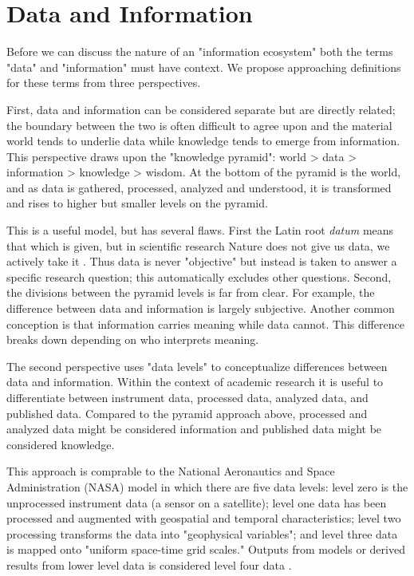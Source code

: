 \section{Data and Information}

Before we can discuss the nature of an "information ecosystem" both the terms "data" and "information" must have context. We propose approaching definitions for these terms from three perspectives. 

First, data and information can be considered separate but are directly related; the boundary between the two is often difficult to agree upon and the material world tends to underlie data while knowledge tends to emerge from information. This perspective draws upon the "knowledge pyramid": world > data > information > knowledge > wisdom. At the bottom of the pyramid is the world, and as data is gathered, processed, analyzed and understood, it is transformed and rises to higher but smaller levels on the pyramid.

This is a useful model, but has several flaws. First the Latin root \textit{datum} means that which is given, but in scientific research Nature does not give us data, we actively take it \citep{kitchin_2014}. Thus data is never "objective" but instead is taken to answer a specific research question; this automatically excludes other questions. Second, the divisions between the pyramid levels is far from clear. For example, the difference between data and information is largely subjective. Another common conception is that information carries meaning while data cannot. This difference breaks down depending on who interprets meaning.

The second perspective uses "data levels" to conceptualize differences between data and information. Within the context of academic research it is useful to differentiate between instrument data, processed data, analyzed data, and published data. Compared to the pyramid approach above, processed and analyzed data might be considered information and published data might be considered knowledge.

This approach is comprable to the National Aeronautics and Space Administration (NASA) model in which there are five data levels: level zero is the unprocessed instrument data (a sensor on a satellite); level one data has been processed and augmented with geospatial and temporal characteristics; level two processing transforms the data into "geophysical variables"; and level three data is mapped onto "uniform space-time grid scales." Outputs from models or derived results from lower level data is considered level four data \citep{nasa_2010}. 

